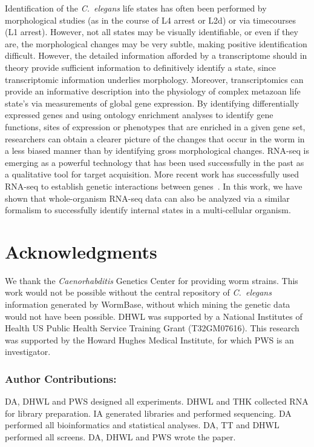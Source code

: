 \documentclass[10pt,letterpaper,twocolumn]{article}
\newcommand{\cel}{\emph{C.~elegans}}
\begin{document}
Identification of the \cel{} life states has often been performed by
morphological studies (as in the course of L4 arrest or L2d) or via
timecourses (L1 arrest). However, not all states may be visually identifiable,
or even if they are, the morphological changes may be very subtle, making
positive identification difficult. However, the detailed information afforded
by a transcriptome should in theory provide sufficient information to
definitively identify a state, since transcriptomic information underlies
morphology. Moreover, transcriptomics can provide an informative description
into the physiology of complex metazoan life state's via measurements of global
gene expression. By identifying differentially expressed genes and using
ontology enrichment analyses to identify gene functions, sites of expression
or phenotypes that are enriched in a given gene set, researchers can obtain a
clearer picture of the changes that occur in the worm in a less biased manner
than by identifying gross morphological changes.
RNA-seq is emerging as a powerful technology that has been used successfully in
the past as a qualitative tool for target acquisition. More recent work has
successfully used RNA-seq to establish genetic interactions between
genes~\cite{Dixit2016,Adamson2016}.
In this work, we have shown that whole-organism RNA-seq data can also be analyzed
via a similar formalism to successfully identify internal
states in a multi-cellular organism.

\section*{Acknowledgments}

We thank the \emph{Caenorhabditis} Genetics Center for providing worm strains.
This work would not be possible without the central repository of \cel{}
information generated by WormBase, without which mining the genetic data would
not have been possible. DHWL was supported by a National Institutes of Health
US Public Health Service Training Grant (T32GM07616). This research was
supported by the Howard Hughes Medical Institute, for which PWS is an
investigator.

\subsubsection*{Author Contributions:}
DA, DHWL and PWS designed all experiments. DHWL and THK collected RNA for
library preparation. IA generated libraries and performed sequencing.
DA performed all bioinformatics and statistical analyses.
DA, TT and DHWL performed all screens. DA, DHWL and PWS wrote the paper.

\nolinenumbers{}




\end{document}
